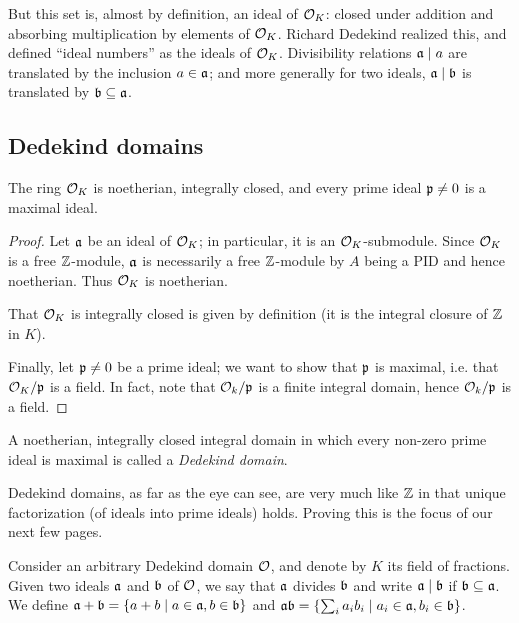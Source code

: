 But this set is, almost by definition, an ideal of $\mathcal{O}_K$: closed under addition and absorbing multiplication by elements of $\mathcal{O}_K$. Richard Dedekind realized this, and defined ``ideal numbers'' as the ideals of $\mathcal{O}_K$. Divisibility relations $\mathfrak{a}\mid a$ are translated by the inclusion $a\in\mathfrak{a}$; and more generally for two ideals, $\mathfrak{a}\mid\mathfrak{b}$ is translated by $\mathfrak{b}\subseteq\mathfrak{a}$.

\subsection{Dedekind domains}


\begin{thm}[Neukirch 3.1]
	The ring $\mathcal{O}_K$ is noetherian, integrally closed, and every prime ideal $\mathfrak{p}\neq 0$ is a maximal ideal.
\end{thm}
\begin{proof}
	Let $\mathfrak{a}$ be an ideal of $\mathcal{O}_K$; in particular, it is an $\mathcal{O}_K$-submodule. Since $\mathcal{O}_K$ is a free $\mathbb{Z}$-module, $\mathfrak{a}$ is necessarily a free $\mathbb{Z}$-module by $A$ being a PID and hence noetherian. Thus $\mathcal{O}_K$ is noetherian.
	
	That $\mathcal{O}_K$ is integrally closed is given by definition (it is the integral closure of $\mathbb{Z}$ in $K$).

	Finally, let $\mathfrak{p}\neq 0$ be a prime ideal; we want to show that $\mathfrak{p}$ is maximal, i.e. that $\mathcal{O}_K/\mathfrak{p}$ is a field. In fact, note that $\mathcal{O}_k/\mathfrak{p}$ is a finite integral domain, hence $\mathcal{O}_k/\mathfrak{p}$ is a field.
\end{proof}

\begin{defn}
	A noetherian, integrally closed integral domain in which every non-zero prime ideal is maximal is called a \emph{Dedekind domain}.
\end{defn}

Dedekind domains, as far as the eye can see, are very much like $\mathbb{Z}$ in that unique factorization (of ideals into prime ideals) holds. Proving this is the focus of our next few pages.

Consider an arbitrary Dedekind domain $\mathcal{O}$, and denote by $K$ its field of fractions. Given two ideals $\mathfrak{a}$ and $\mathfrak{b}$ of $\mathcal{O}$, we say that $\mathfrak{a}$ divides $\mathfrak{b}$ and write $\mathfrak{a}\mid\mathfrak{b}$ if $\mathfrak{b}\subseteq\mathfrak{a}$. We define $\mathfrak{a}+\mathfrak{b}=\{a+b\mid a\in\mathfrak{a}, b\in\mathfrak{b}\}$ and $\mathfrak{a}\mathfrak{b} = \{\sum_i a_ib_i \mid a_i\in\mathfrak{a}, b_i\in\mathfrak{b}\}$.

